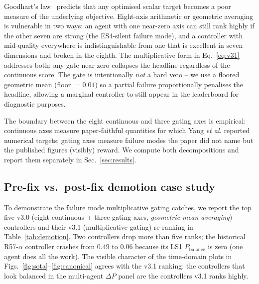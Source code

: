 \documentclass[journal,onecolumn,11pt]{IEEEtran}
\begin{document}
Goodhart's law~\cite{goodhart1984} predicts that any optimised
scalar target becomes a poor measure of the underlying objective.
Eight-axis arithmetic or geometric averaging is vulnerable in two
ways: an agent with one near-zero axis can still rank highly if the
other seven are strong (the ES4-silent failure mode), and a
controller with mid-quality everywhere is indistinguishable from one
that is excellent in seven dimensions and broken in the eighth. The
multiplicative form in Eq.~\ref{eq:v31} addresses both: any gate
near zero collapses the headline regardless of the continuous score.
The gate is intentionally \emph{not} a hard veto -- we use a
floored geometric mean (floor $= 0.01$) so a partial failure
proportionally penalises the headline, allowing a marginal controller
to still appear in the leaderboard for diagnostic purposes.

The boundary between the eight continuous and three gating axes is
empirical: continuous axes measure paper-faithful quantities for
which Yang \emph{et al.} reported numerical targets; gating axes
measure failure modes the paper did not name but the published
figures (visibly) reward. We compute both decompositions and report
them separately in Sec.~\ref{sec:results}.

\subsection{Pre-fix vs.\ post-fix demotion case study}\label{sec:demotion}

To demonstrate the failure mode multiplicative gating catches, we
report the top five v3.0 (eight continuous + three gating axes,
\emph{geometric-mean averaging}) controllers and their v3.1
(multiplicative-gating) re-ranking in Table~\ref{tab:demotion}.
Two controllers drop more than five ranks; the historical R57-$\alpha$
controller crashes from $0.49$ to $0.06$ because its LS1
$P_{\text{balance}}$ is zero (one agent does all the work). The
visible character of the time-domain plots in
Figs.~\ref{fig:sota}--\ref{fig:canonical} agrees with the v3.1
ranking: the controllers that look balanced in the multi-agent
$\Delta P$ panel are the controllers v3.1 ranks highly.
\end{document}
